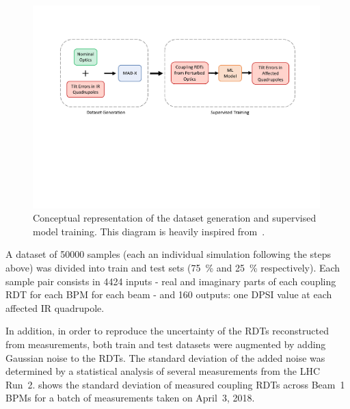 \begin{figure}[!htb]
    \centering
    \includegraphics*[width=0.99\textwidth]{Figures/ML_for_IR_Coupling/supervised_training_schematic.pdf}
    \caption{Conceptual representation of the dataset generation and supervised model training. This diagram is heavily inspired from~\cite{PHD:Fol:Application_ML_Beam_Optics}.}
    \label{figure:ml_supervised_training_schematic}
\end{figure}

A dataset of \num{50000} samples (each an individual simulation following the steps above) was divided into train and test sets (\qty{75}{\percent} and \qty{25}{\percent} respectively).
Each sample pair consists in \num{4424} inputs - real and imaginary parts of each coupling RDT for each BPM for each beam - and \num{160} outputs: one DPSI value at each affected IR quadrupole.

In addition, in order to reproduce the uncertainty of the RDTs reconstructed from measurements, both train and test datasets were augmented by adding Gaussian noise to the RDTs.
The standard deviation of the added noise was determined by a statistical analysis of several measurements from the LHC Run~\num{2}.
 shows the standard deviation of measured coupling RDTs across Beam~\num{1} BPMs for a batch of measurements taken on April~\num{3}, \num{2018}.

